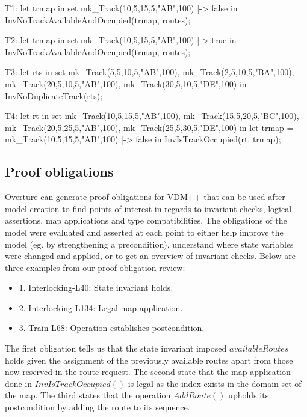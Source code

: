 \documentclass[preprint,12pt]{elsarticle}
\begin{document}
\begin{vdmsl}[label=lst:itlcomb1,caption={Four combinatorial tests that exercise our invariant functions in the Interlocking class.}]
	T1: let trmap in set
	 {{mk_Track(10,5,15,5,"AB",100) |-> false}} in
	InvNoTrackAvailableAndOccupied(trmap, routes);
	
	T2: let trmap in set
	 {{mk_Track(10,5,15,5,"AB",100) |-> true}} in
	InvNoTrackAvailableAndOccupied(trmap, routes);
	
	T3: let rts in set {{{mk_Track(5,5,10,5,"AB",100),
		mk_Track(2,5,10,5,"BA",100)},
		{mk_Track(20,5,10,5,"AB",100),
		mk_Track(30,5,10,5,"DE",100)}}} in
			InvNoDuplicateTrack(rts);
	
	T4: let rt in set {{mk_Track(10,5,15,5,"AB",100),
			mk_Track(15,5,20,5,"BC",100)},
			{mk_Track(20,5,25,5,"AB",100),
			 mk_Track(25,5,30,5,"DE",100)}} in
	let trmap = {mk_Track(10,5,15,5,"AB",100) |-> false} in
	InvIsTrackOccupied(rt, trmap);
\end{vdmsl}

\subsection{Proof obligations}

Overture can generate proof obligations for VDM++ that can be used after model creation to find points of interest in regards to invariant checks, logical assertions, map applications and type compatibilities. The obligations of the model were evaluated and asserted at each point to either help improve the model (eg. by strengthening a precondition), understand where state variables were changed and applied, or to get an overview of invariant checks. Below are three examples from our proof obligation review:

\begin{itemize}
	\item 1. Interlocking-L40: State invariant holds.
	\item 2. Interlocking-L134: Legal map application.
	\item 3. Train-L68: Operation establishes postcondition.
\end{itemize}

The first obligation tells us that the state invariant imposed $availableRoutes$ holds given the assignment of the previously available routes apart from those now reserved in the route request. The second state that the map application done in $InvIsTrackOccupied()$ is legal as the index exists in the domain set of the map. The third states that the operation $AddRoute()$ upholds its postcondition by adding the route to its sequence.
\end{document}
